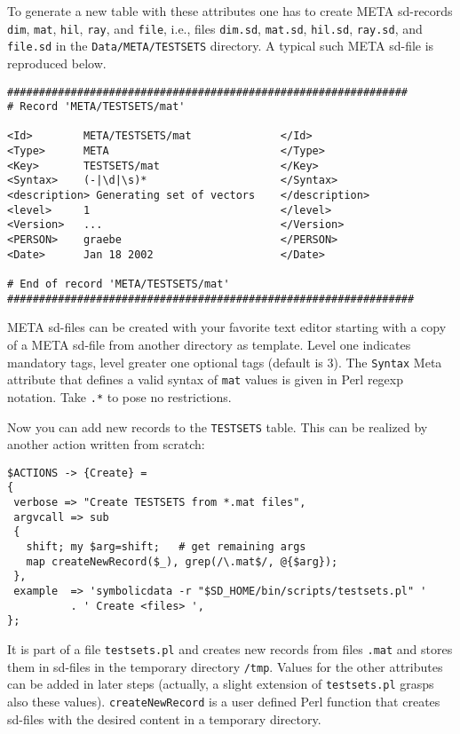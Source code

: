 \documentclass[11pt]{article}
\begin{document}
To generate a new table with these attributes one has to create META
sd-records {\tt dim}, {\tt mat}, {\tt hil}, {\tt ray}, and {\tt file},
i.e., files {\tt dim.sd}, {\tt mat.sd}, {\tt hil.sd}, {\tt ray.sd},
and {\tt file.sd} in the {\tt Data/META/TESTSETS} directory. A typical
such META sd-file is reproduced below.

\begin{table}[ht]
{\small\begin{verbatim}
###############################################################
# Record 'META/TESTSETS/mat'

<Id>        META/TESTSETS/mat              </Id>
<Type>      META                           </Type>
<Key>       TESTSETS/mat                   </Key>
<Syntax>    (-|\d|\s)*                     </Syntax>
<description> Generating set of vectors    </description>
<level>     1                              </level>
<Version>   ...                            </Version>
<PERSON>    graebe                         </PERSON>
<Date>      Jan 18 2002                    </Date>

# End of record 'META/TESTSETS/mat'
################################################################
\end{verbatim}}
\end{table}

META sd-files can be created with your favorite text editor starting
with a copy of a META sd-file from another directory as template.
Level one indicates mandatory tags, level greater one optional tags
(default is 3). The {\tt Syntax} Meta attribute that defines a valid
syntax of {\tt mat} values is given in Perl regexp notation.  Take
{\tt .*} to pose no restrictions.

Now you can add new records to the {\tt TESTSETS} table.  This
can be realized by another action written from scratch:
{\small\begin{verbatim}
$ACTIONS -> {Create} =
{
 verbose => "Create TESTSETS from *.mat files",
 argvcall => sub 
 {
   shift; my $arg=shift;   # get remaining args
   map createNewRecord($_), grep(/\.mat$/, @{$arg});
 },
 example  => 'symbolicdata -r "$SD_HOME/bin/scripts/testsets.pl" '
          . ' Create <files> ',
};
\end{verbatim}}
It is part of a file {\tt testsets.pl} and creates new records from
files {\tt *.mat} and stores them in sd-files in the temporary
directory {\tt /tmp}. Values for the other attributes can be added in
later steps (actually, a slight extension of {\tt testsets.pl} grasps
also these values). {\tt createNewRecord} is a user defined Perl
function that creates sd-files with the desired content in a temporary
directory. 
\end{document}
